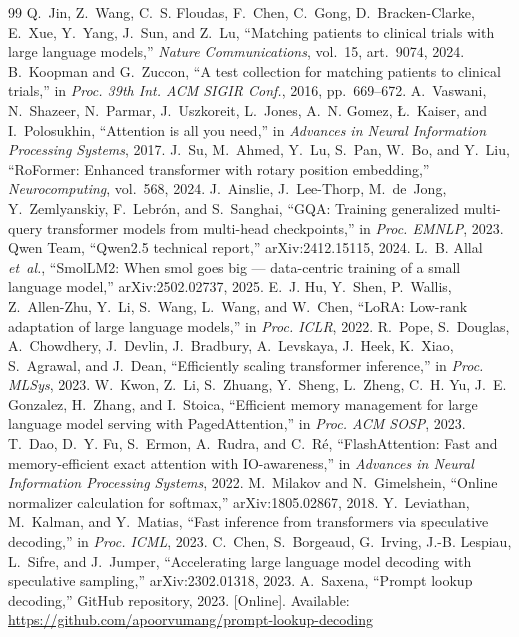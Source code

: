 \documentclass[conference]{IEEEtran}
\begin{document}
\begin{thebibliography}{99}
 Q.~Jin, Z.~Wang, C.~S. Floudas, F.~Chen, C.~Gong, D.~Bracken-Clarke, E.~Xue, Y.~Yang, J.~Sun, and Z.~Lu, ``Matching patients to clinical trials with large language models,'' \emph{Nature Communications}, vol.~15, art.~9074, 2024.
 B.~Koopman and G.~Zuccon, ``A test collection for matching patients to clinical trials,'' in \emph{Proc. 39th Int. ACM SIGIR Conf.}, 2016, pp.~669--672.
 A.~Vaswani, N.~Shazeer, N.~Parmar, J.~Uszkoreit, L.~Jones, A.~N. Gomez, {\L}.~Kaiser, and I.~Polosukhin, ``Attention is all you need,'' in \emph{Advances in Neural Information Processing Systems}, 2017.
 J.~Su, M.~Ahmed, Y.~Lu, S.~Pan, W.~Bo, and Y.~Liu, ``RoFormer: Enhanced transformer with rotary position embedding,'' \emph{Neurocomputing}, vol.~568, 2024.
 J.~Ainslie, J.~Lee-Thorp, M.~de~Jong, Y.~Zemlyanskiy, F.~Lebr{\'o}n, and S.~Sanghai, ``GQA: Training generalized multi-query transformer models from multi-head checkpoints,'' in \emph{Proc. EMNLP}, 2023.
 Qwen Team, ``Qwen2.5 technical report,'' arXiv:2412.15115, 2024.
 L.~B. Allal \emph{et~al.}, ``SmolLM2: When smol goes big --- data-centric training of a small language model,'' arXiv:2502.02737, 2025.
 E.~J. Hu, Y.~Shen, P.~Wallis, Z.~Allen-Zhu, Y.~Li, S.~Wang, L.~Wang, and W.~Chen, ``LoRA: Low-rank adaptation of large language models,'' in \emph{Proc. ICLR}, 2022.
 R.~Pope, S.~Douglas, A.~Chowdhery, J.~Devlin, J.~Bradbury, A.~Levskaya, J.~Heek, K.~Xiao, S.~Agrawal, and J.~Dean, ``Efficiently scaling transformer inference,'' in \emph{Proc. MLSys}, 2023.
 W.~Kwon, Z.~Li, S.~Zhuang, Y.~Sheng, L.~Zheng, C.~H. Yu, J.~E. Gonzalez, H.~Zhang, and I.~Stoica, ``Efficient memory management for large language model serving with PagedAttention,'' in \emph{Proc. ACM SOSP}, 2023.
 T.~Dao, D.~Y. Fu, S.~Ermon, A.~Rudra, and C.~R{\'e}, ``FlashAttention: Fast and memory-efficient exact attention with IO-awareness,'' in \emph{Advances in Neural Information Processing Systems}, 2022.
 M.~Milakov and N.~Gimelshein, ``Online normalizer calculation for softmax,'' arXiv:1805.02867, 2018.
 Y.~Leviathan, M.~Kalman, and Y.~Matias, ``Fast inference from transformers via speculative decoding,'' in \emph{Proc. ICML}, 2023.
 C.~Chen, S.~Borgeaud, G.~Irving, J.-B. Lespiau, L.~Sifre, and J.~Jumper, ``Accelerating large language model decoding with speculative sampling,'' arXiv:2302.01318, 2023.
 A.~Saxena, ``Prompt lookup decoding,'' GitHub repository, 2023. [Online]. Available: \url{https://github.com/apoorvumang/prompt-lookup-decoding}
\end{thebibliography}
\end{document}
